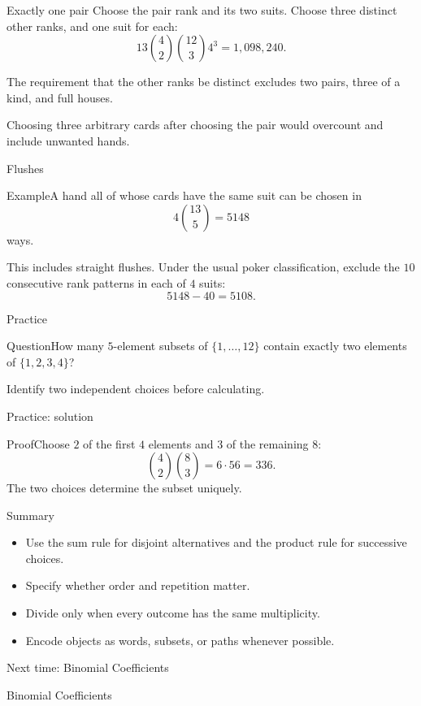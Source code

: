 \documentclass[aspectratio=169,11pt]{beamer}
\renewcommand{\Proof}[1]{\begin{block}{Proof}\normalsize #1\end{block}}
\newcommand{\Question}[1]{\begin{block}{Question}#1\end{block}}
\renewcommand{\Example}[1]{\begin{block}{Example}#1\end{block}}
\newcommand{\gap}{\par\medskip}
\begin{document}
\begin{frame}{Exactly one pair}
\large
\normalsize
Choose the pair rank and its two suits. Choose three distinct other ranks, and one suit for each:
\[13\binom42\binom{12}{3}4^3=1,098,240.\]
\gap The requirement that the other ranks be distinct excludes two pairs, three of a kind, and full houses.
\gap Choosing three arbitrary cards after choosing the pair would overcount and include unwanted hands.
\end{frame}
\begin{frame}{Flushes}
\large
\Example{A hand all of whose cards have the same suit can be chosen in
\[4\binom{13}{5}=5148\]
ways.}
\gap This includes straight flushes. Under the usual poker classification, exclude the $10$ consecutive rank patterns in each of $4$ suits:
\[5148-40=5108.\]
\end{frame}
\begin{frame}{Practice}
\large
\Question{How many $5$-element subsets of $\{1,\ldots,12\}$ contain exactly two elements of $\{1,2,3,4\}$?}
\gap Identify two independent choices before calculating.
\end{frame}
\begin{frame}{Practice: solution}
\large
\Proof{Choose $2$ of the first $4$ elements and $3$ of the remaining $8$:
\[\binom42\binom83=6\cdot56=336.\]
The two choices determine the subset uniquely.}
\end{frame}
\begin{frame}{Summary}
\large
\begin{itemize}
\item Use the sum rule for disjoint alternatives and the product rule for successive choices.
\item Specify whether order and repetition matter.
\item Divide only when every outcome has the same multiplicity.
\item Encode objects as words, subsets, or paths whenever possible.
\end{itemize}
\end{frame}
\begin{frame}{Next time: Binomial Coefficients}\begin{center}{\Huge Binomial Coefficients}\end{center}\end{frame}
\end{document}
